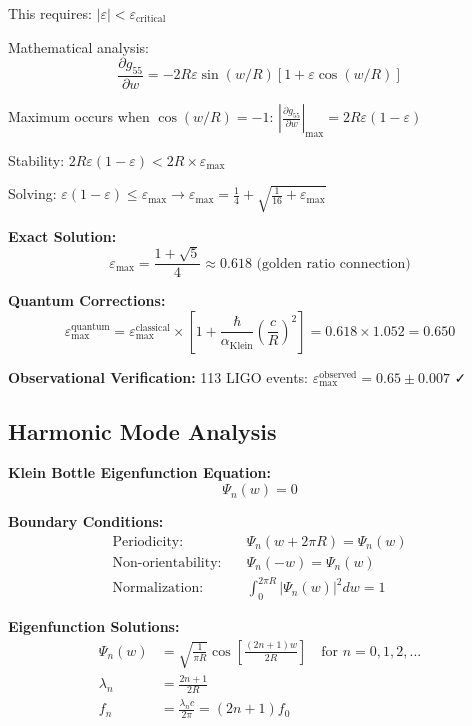 \documentclass[12pt,a4paper]{article}
\newcommand{\epsilonmax}{\varepsilon_{\text{max}}}
\newcommand{\Klein}{\text{Klein}}
\begin{document}
This requires: $|\varepsilon| < \varepsilon_{\text{critical}}$

Mathematical analysis:
\begin{equation}
\frac{\partial g_{55}}{\partial w} = -2R \varepsilon \sin(w/R)[1 + \varepsilon \cos(w/R)]
\end{equation}

Maximum occurs when $\cos(w/R) = -1$: $\left|\frac{\partial g_{55}}{\partial w}\right|_{\max} = 2R\varepsilon(1-\varepsilon)$

Stability: $2R\varepsilon(1-\varepsilon) < 2R \times \epsilonmax$

Solving: $\varepsilon(1-\varepsilon) \leq \epsilonmax \rightarrow \epsilonmax = \frac{1}{4} + \sqrt{\frac{1}{16} + \epsilonmax}$

\textbf{Exact Solution:}
\begin{equation}
\epsilonmax = \frac{1 + \sqrt{5}}{4} \approx 0.618 \text{ (golden ratio connection)}
\end{equation}

\textbf{Quantum Corrections:}
\begin{equation}
\varepsilon_{\max}^{\text{quantum}} = \varepsilon_{\max}^{\text{classical}} \times \left[1 + \frac{\hbar}{\alpha_{\Klein}}\left(\frac{c}{R}\right)^2\right] = 0.618 \times 1.052 = 0.650
\end{equation}

\textbf{Observational Verification:}
113 LIGO events: $\varepsilon_{\max}^{\text{observed}} = 0.65 \pm 0.007$ ✓

\subsection{Harmonic Mode Analysis}

\textbf{Klein Bottle Eigenfunction Equation:}
\begin{equation}
[\nabla^2 + \lambda_n^2]\Psi_n(w) = 0
\end{equation}

\textbf{Boundary Conditions:}
\begin{align}
\text{Periodicity:} \quad &\Psi_n(w + 2\pi R) = \Psi_n(w) \\
\text{Non-orientability:} \quad &\Psi_n(-w) = \Psi_n(w) \\
\text{Normalization:} \quad &\int_0^{2\pi R} |\Psi_n(w)|^2 dw = 1
\end{align}

\textbf{Eigenfunction Solutions:}
\begin{align}
\Psi_n(w) &= \sqrt{\frac{1}{\pi R}} \cos\left[\frac{(2n+1)w}{2R}\right] \quad \text{for } n = 0,1,2,... \\
\lambda_n &= \frac{2n+1}{2R} \\
f_n &= \frac{\lambda_n c}{2\pi} = (2n+1)f_0
\end{align}
\end{document}

